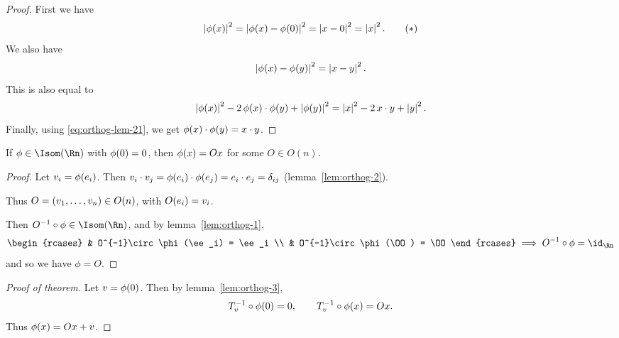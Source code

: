 \begin{proof}
	First we have
	\begin{equation*}
		\left\vert \phi(x) \right\vert^2
		= \left\vert \phi(x)-\phi(0) \right\vert^2
		= \left\vert x-0 \right\vert^2
		= \left\vert x \right\vert^2.
		\tag{$*$}
		\label{eq:orthog-lem-21}
	\end{equation*}
	We also have
	\begin{equation*}
		\left\vert \phi(x)-\phi(y) \right\vert^2 = \left\vert x-y \right\vert^2.
	\end{equation*}
	This is also equal to
	\begin{equation*}
		\left\vert \phi(x) \right\vert^2 - 2\,\phi(x) \cdot \phi(y) + \left\vert \phi(y) \right\vert^2
		= \left\vert x \right\vert^2 - 2\,x\cdot y + \left\vert y \right\vert^2.
	\end{equation*}
	Finally, using \eqref{eq:orthog-lem-21}, we get $\phi(x)\cdot\phi(y) = x\cdot y$. %
\end{proof}

\begin{lemma}
	\label{lem:orthog-3} If $\phi\in\Isom(\Rn)$ with $\phi(0)=0$, then $\phi(x) = Ox$ for some $O\in O(n)$. %
\end{lemma}

\begin{proof}
	Let $v_i=\phi(e_i)$. Then $v_i\cdot v_j = \phi(e_i) \cdot \phi(e_j) = e_i \cdot e_j = \delta_{ij}$ (lemma~\ref{lem:orthog-2}). %

	Thus $O=(v_1,\ldots,v_n) \in O(n)$, with $O(e_i)=v_i$.

	Then $O^{-1}\circ\phi\in\Isom(\Rn)$, and by lemma~\ref{lem:orthog-1},
	\begin{equation*}
		\begin{rcases}
			& O^{-1}\circ\phi(\ee_i) = \ee_i \\
			& O^{-1}\circ\phi(\OO) = \OO
		\end{rcases}
		\implies O^{-1}\circ \phi=\textstyle \id_{\Rn}
	\end{equation*}
	and so we have $\phi=O$. %
\end{proof}

\begin{proof}
	[Proof of theorem] Let $v = \phi(0)$. Then by lemma~\ref{lem:orthog-3},
	\begin{equation*}
		T_{v}^{-1} \circ \phi(0) = 0, \qquad
		T_{v}^{-1} \circ \phi(x) = Ox.
	\end{equation*}
	Thus $\phi(x)=Ox+v$. %
\end{proof}


